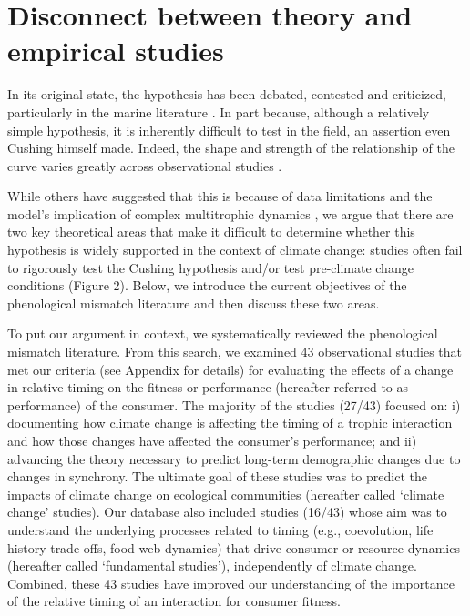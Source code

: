 \documentclass[11pt,letterpaper]{article}
\begin{document}
\section{Disconnect between theory and empirical studies}
In its original state, the hypothesis has been debated, contested and criticized, particularly in the marine literature \citep{leggett1994, durant2007}. In part because, although a relatively simple hypothesis, it is inherently difficult to test in the field, an assertion even Cushing himself made. Indeed, the shape and strength of the relationship of the curve varies greatly across observational studies \citep[e.g.,][]{philippart2013, reed2013, plard2014, atkinson2015}. \par

While others have suggested that this is because of data limitations and the model’s implication of complex multitrophic dynamics \citep{durant2007, kerby2012}, we argue that there are two key theoretical areas that make it difficult to determine whether this hypothesis is widely supported in the context of climate change: studies often fail to rigorously test the Cushing hypothesis and/or test pre-climate change conditions (Figure 2). Below, we introduce the current objectives of the phenological mismatch literature and then discuss these two areas.\par

To put our argument in context, we systematically reviewed the phenological mismatch literature. From this search, we examined 43 observational studies that met our criteria (see Appendix for details) for evaluating the effects of a change in relative timing on the fitness or performance (hereafter referred to as performance) of the consumer. The majority of the studies (27/43) focused on: i) documenting how climate change is affecting the timing of a trophic interaction and how those changes have affected the consumer’s performance; and ii) advancing the theory necessary to predict long-term demographic changes due to changes in synchrony. The ultimate goal of these studies was to predict the impacts of climate change on ecological communities (hereafter called ‘climate change’ studies). Our database also included studies (16/43) whose aim was to understand the underlying processes related to timing (e.g., coevolution, life history trade offs, food web dynamics) that drive consumer or resource dynamics (hereafter called ‘fundamental studies’), independently of climate change. Combined, these 43 studies have improved our understanding of the importance of the relative timing of an interaction for consumer fitness.\par
\end{document}
